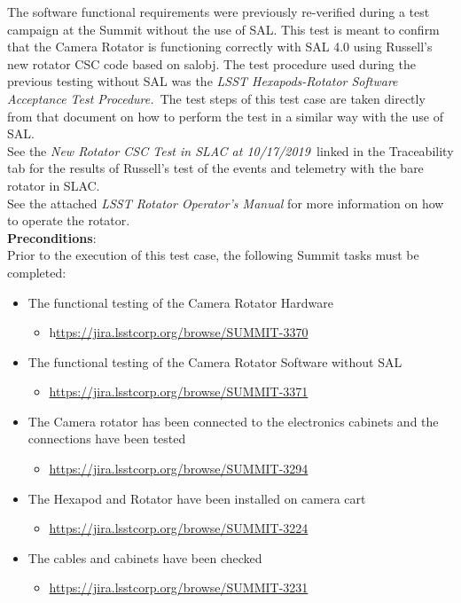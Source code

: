 \documentclass[SE,STR,toc]{lsstdoc}
\providecommand{\tightlist}{
  \setlength{\itemsep}{0pt}\setlength{\parskip}{0pt}}
\begin{document}
The software functional requirements were previously re-verified during
a test campaign at the Summit without the use of SAL. This test is meant
to confirm that the Camera Rotator is functioning correctly with SAL 4.0
using Russell's new rotator CSC code based on salobj. The test procedure
used during the previous testing without SAL was the \emph{LSST
Hexapods-Rotator Software Acceptance Test Procedure.~}The test steps of
this test case are taken directly from that document on how to perform
the test in a similar way with the use of SAL.\\[2\baselineskip]See the
\emph{New Rotator CSC Test in SLAC at 10/17/2019~}linked in the
Traceability tab for the results of Russell's test of the events and
telemetry with the bare rotator in SLAC.\\[2\baselineskip]See the
attached \emph{LSST Rotator Operator's Manual} for more information on
how to operate the rotator.\\[2\baselineskip]


\textbf{ Preconditions}:\\
 Prior to the execution of this test case, the following Summit tasks
must be completed:

\begin{itemize}
\tightlist
\item
  The functional testing of the Camera Rotator Hardware~

  \begin{itemize}
  \tightlist
  \item
    h\href{https://jira.lsstcorp.org/browse/SUMMIT-3370}{ttps://jira.lsstcorp.org/browse/SUMMIT-3370}
  \end{itemize}
\item
  The functional testing of the Camera Rotator Software without SAL

  \begin{itemize}
  \tightlist
  \item
    \url{https://jira.lsstcorp.org/browse/SUMMIT-3371}
  \end{itemize}
\item
  The Camera rotator has been connected to the electronics cabinets and
  the connections have been tested

  \begin{itemize}
  \tightlist
  \item
    \url{https://jira.lsstcorp.org/browse/SUMMIT-3294}
  \end{itemize}
\item
  The Hexapod and Rotator have been installed on camera cart

  \begin{itemize}
  \tightlist
  \item
    \url{https://jira.lsstcorp.org/browse/SUMMIT-3224}
  \end{itemize}
\item
  The cables and cabinets have been checked

  \begin{itemize}
  \tightlist
  \item
    \url{https://jira.lsstcorp.org/browse/SUMMIT-3231}
  \end{itemize}
\end{itemize}
\end{document}
